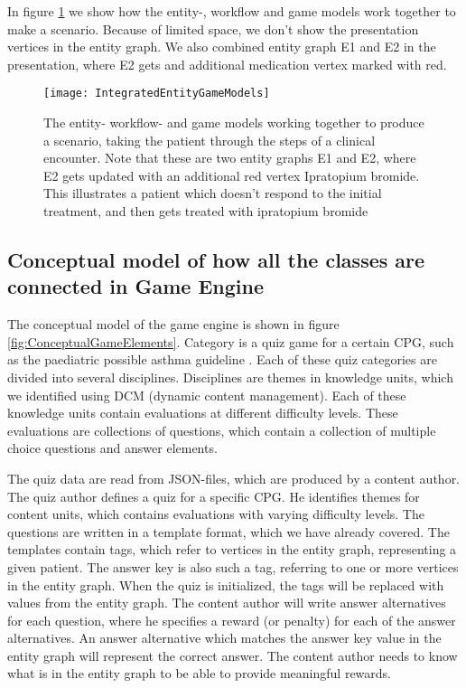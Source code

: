 In figure \ref{fig:IntegratedEntityGamelModels} we show how the entity-, workflow and game models work together to make a scenario. Because of limited space, we don't show the presentation vertices in the entity graph. We also combined entity graph E1 and E2 in the presentation, where E2 gets and additional medication vertex marked with red. 

\begin{figure}[h!]
	\texttt{[image: IntegratedEntityGameModels]}
		\caption {The entity- workflow- and game models working together to produce a scenario, taking the patient through the steps of a clinical encounter. Note that these are two entity graphs E1 and E2, where E2 gets updated with an additional red vertex Ipratopium bromide. This illustrates a patient which doesn't respond to the initial treatment, and then gets treated with ipratopium bromide}
		\label{fig:IntegratedEntityGamelModels}
\end{figure}

\subsection{Conceptual model of how all the classes are connected in Game Engine}
The conceptual model of the game engine is shown in figure \ref{fig:ConceptualGameElements}. Category is a quiz game for a certain CPG, such as the paediatric possible asthma guideline \parencite{RepublicofKeny2016}. Each of these quiz categories are divided into several disciplines. Disciplines are themes in knowledge units, which we identified using DCM (dynamic content management). Each of these knowledge units contain evaluations at different difficulty levels. These evaluations are collections of questions, which contain a collection of multiple choice questions and answer elements.

The quiz data are read from JSON-files, which are produced by a content author. The quiz author defines a quiz for a specific CPG. He identifies themes for content units, which contains evaluations with varying difficulty levels. The questions are written in a template format, which we have already covered. The templates contain tags, which refer to vertices in the entity graph, representing a given patient. The answer key is also such a tag, referring to one or more vertices in the entity graph. When the quiz is initialized, the tags will be replaced with values from the entity graph. The content author will write answer alternatives for each question, where he specifies a reward (or penalty) for each of the answer alternatives. An answer alternative which matches the answer key value in the entity graph will represent the correct answer. The content author needs to know what is in the entity graph to be able to provide meaningful rewards.

